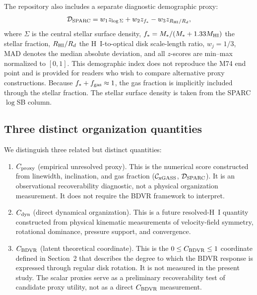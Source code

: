 \documentclass[11pt]{article}
\begin{document}
The repository also includes a separate diagnostic demographic proxy:
\begin{equation}
\mathcal{D}_{\rm SPARC} = w_1 z_{\log\Sigma} + w_2 z_{f_*} - w_3 z_{R_{\rm HI}/R_d},
\label{eq:d_sparc_demographic}
\end{equation}
where $\Sigma$ is the central stellar surface density, $f_* = M_*/(M_* + 1.33 M_{\rm HI})$ the stellar fraction, $R_{\rm HI}/R_d$ the H~I-to-optical disk scale-length ratio, $w_j = 1/3$, MAD denotes the median absolute deviation, and all $z$-scores are min--max normalized to $[0,1]$. This demographic index does not reproduce the M74 end point and is provided for readers who wish to compare alternative proxy constructions. Because $f_* + f_{\rm gas} \approx 1$, the gas fraction is implicitly included through the stellar fraction. The stellar surface density is taken from the SPARC $\log$SB column.

\subsection{Three distinct organization quantities}

We distinguish three related but distinct quantities:

\begin{enumerate}

\item \textbf{$C_{\rm proxy}$} (empirical unresolved proxy). This is the numerical score constructed from linewidth, inclination, and gas fraction ($\mathcal{C}_{\rm xGASS}$, $\mathcal{D}_{\rm SPARC}$). It is an observational recoverability diagnostic, not a physical organization measurement. It does not require the BDVR framework to interpret.

\item \textbf{$C_{\rm dyn}$} (direct dynamical organization). This is a future resolved-H~I quantity constructed from physical kinematic measurements of velocity-field symmetry, rotational dominance, pressure support, and convergence.

\item \textbf{$C_{\rm BDVR}$} (latent theoretical coordinate). This is the $0 \leq C_{\rm BDVR} \leq 1$ coordinate defined in Section~2 that describes the degree to which the BDVR response is expressed through regular disk rotation. It is not measured in the present study. The scalar proxies serve as a preliminary recoverability test of candidate proxy utility, not as a direct $C_{\rm BDVR}$ measurement.

\end{enumerate}
\end{document}
